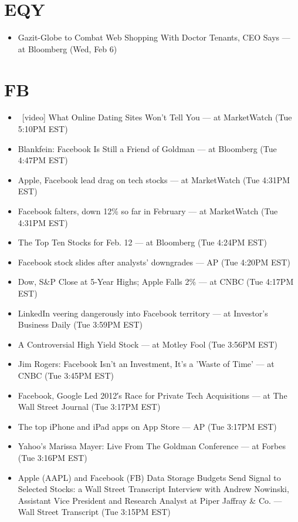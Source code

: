 \documentclass[11pt,asymmetric]{article}
\begin{document}
\section*{EQY}
\begin{itemize}
\item Gazit-Globe to Combat Web Shopping With Doctor Tenants, CEO Says --- at Bloomberg (Wed, Feb 6)
\end{itemize}

\section*{FB}
\begin{itemize}
\item\ [video] What Online Dating Sites Won't Tell You --- at MarketWatch (Tue 5:10PM EST)
\item Blankfein: Facebook Is Still a Friend of Goldman --- at Bloomberg (Tue 4:47PM EST)
\item Apple, Facebook lead drag on tech stocks --- at MarketWatch (Tue 4:31PM EST)
\item Facebook falters, down 12\% so far in February --- at MarketWatch (Tue 4:31PM EST)
\item The Top Ten Stocks for Feb. 12 --- at Bloomberg (Tue 4:24PM EST)
\item Facebook stock slides after analysts' downgrades --- AP (Tue 4:20PM EST)
\item Dow, S\&P Close at 5-Year Highs; Apple Falls 2\% --- at CNBC (Tue 4:17PM EST)
\item LinkedIn veering dangerously into Facebook territory --- at Investor's Business Daily (Tue 3:59PM EST)
\item A Controversial High Yield Stock --- at Motley Fool (Tue 3:56PM EST)
\item Jim Rogers: Facebook Isn't an Investment, It's a 'Waste of Time' --- at CNBC (Tue 3:45PM EST)
\item Facebook, Google Led 2012′s Race for Private Tech Acquisitions --- at The Wall Street Journal (Tue 3:17PM EST)
\item The top iPhone and iPad apps on App Store --- AP (Tue 3:17PM EST)
\item Yahoo's Marissa Mayer: Live From The Goldman Conference --- at Forbes (Tue 3:16PM EST)
\item Apple (AAPL) and Facebook (FB) Data Storage Budgets Send Signal to Selected Stocks: a Wall Street Transcript Interview with Andrew Nowinski, Assistant Vice President and Research Analyst at Piper Jaffray \& Co. --- Wall Street Transcript (Tue 3:15PM EST)

\end{itemize}
\end{document}
